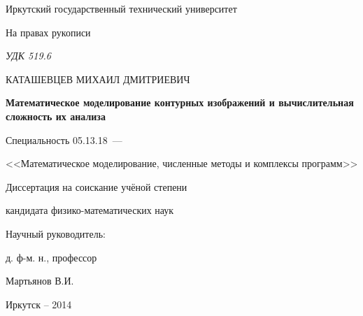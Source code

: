 \thispagestyle{empty}

\begin{center}
Иркутский государственный технический университет\par
\par
\end{center}

\vspace{20mm}
\begin{flushright}
На правах рукописи

{\sl УДК 519.6}
\end{flushright}

\vspace{30mm}
\begin{center}
{\large КАТАШЕВЦЕВ МИХАИЛ ДМИТРИЕВИЧ}
\end{center}

\vspace{5mm}
\begin{center}
{\bf \large Математическое моделирование контурных изображений и вычислительная сложность их анализа
\par}

\vspace{10mm}
{%
Специальность 05.13.18~---

<<Математическое моделирование, численные методы и комплексы программ>>
}

\vspace{10mm}
Диссертация на соискание учёной степени

кандидата физико-математических наук
\end{center}

\vspace{20mm}
\begin{flushright}
Научный руководитель:

д. ф-м. н., профессор

Мартьянов В.И.

\end{flushright}

\vspace{20mm}
\begin{center}
{Иркутск -- 2014}
\end{center}

\newpage